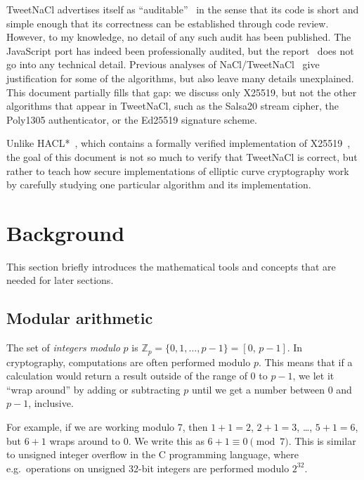\documentclass[manuscript]{acmart}
\begin{document}
TweetNaCl advertises itself as ``auditable''~\cite{Bernstein:2014ca} in the sense that its code is short and simple enough that its correctness can be established through code review.
However, to my knowledge, no detail of any such audit has been published.
The JavaScript port has indeed been professionally audited, but the report~\cite{TweetNaClAudit} does not go into any technical detail.
Previous analyses of NaCl/TweetNaCl~\cite{Bernstein:2009,Janssen:2014} give justification for some of the algorithms, but also leave many details unexplained.
This document partially fills that gap: we discuss only X25519, but not the other algorithms that appear in TweetNaCl, such as the Salsa20 stream cipher, the Poly1305 authenticator, or the Ed25519 signature scheme.

Unlike HACL*~\cite{HACLStar}, which contains a formally verified implementation of X25519~\cite{Zinzindohoue:2017fc}, the goal of this document is not so much to verify that TweetNaCl is correct, but rather to teach how secure implementations of elliptic curve cryptography work by carefully studying one particular algorithm and its implementation.

\section{Background}\label{sec:background}

This section briefly introduces the mathematical tools and concepts that are needed for later sections.

\subsection{Modular arithmetic}\label{sec:modular-arithmetic}

The set of \emph{integers modulo} $p$ is $\mathbb{Z}_p = \{0, 1, \dots, p-1\} = [0,\, p-1]$.
In cryptography, computations are often performed modulo $p$.
This means that if a calculation would return a result outside of the range of 0 to $p-1$, we let it ``wrap around'' by adding or subtracting $p$ until we get a number between 0 and $p-1$, inclusive.

For example, if we are working modulo 7, then $1+1=2$, $2+1=3$, \dots, $5+1=6$, but $6+1$ wraps around to $0$.
We write this as $6+1 \equiv 0 \pmod{7}$.
This is similar to unsigned integer overflow in the C programming language, where e.g.\ operations on unsigned 32-bit integers are performed modulo $2^{32}$.
\end{document}
